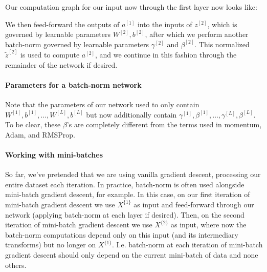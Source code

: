 \documentclass[12pt]{article}
\begin{document}
Our computation graph for our input now through the first layer now looks like:

\begin{figure}[h]
\centering
{}
\end{figure}
We then feed-forward the outputs of $a^{[1]}$ into the inputs of $z^{[2]}$, which is governed by 
learnable parameters $W^{[2]}, b^{[2]}$, after which we perform another batch-norm governed by learnable
parameters $\gamma^{[2]}$ and $\beta^{[2]}$. This normalized $\tilde z^{[2]}$ is used to compute $a^{[2]}$, and we 
continue in this fashion through the remainder of the network if desired.

\paragraph{Parameters for a batch-norm network}
Note that the parameters of our network used to only contain $W^{[1]}, b^{[1]}, \ldots, W^{[L]}, b^{[L]}$ but now 
additionally contain $\gamma^{[1]}, \beta^{[1]}, \ldots, \gamma^{[L]}, \beta^{[L]}$. To be clear, these $\beta$'s are 
completely different from the terms used in momentum, Adam, and RMSProp.

\paragraph{Working with mini-batches} So far, we've pretended that we are using vanilla gradient descent, 
processing our entire dataset each iteration. In practice, batch-norm is often used alongside mini-batch gradient
descent, for example. In this case, on our first iteration of mini-batch gradient descent we use
$X^{\{1\}}$ as input and feed-forward through our network (applying batch-norm at each layer if desired). Then, on the
second iteration of mini-batch gradient descent we use $X^{\{2\}}$ as input, where now the batch-norm computations depend only on this input (and its intermediary transforms) but no longer on $X^{\{1\}}$. I.e. batch-norm at each iteration of mini-batch gradient descent should only depend on the current mini-batch of data and none others.
\end{document}
